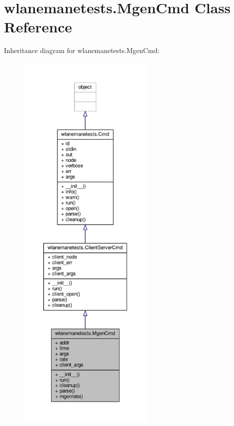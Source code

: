 \hypertarget{classwlanemanetests_1_1_mgen_cmd}{\section{wlanemanetests.\+Mgen\+Cmd Class Reference}
\label{classwlanemanetests_1_1_mgen_cmd}
}


Inheritance diagram for wlanemanetests.\+Mgen\+Cmd\+:
\nopagebreak
\begin{figure}[H]
\begin{center}
\leavevmode
\includegraphics[height=550pt]{classwlanemanetests_1_1_mgen_cmd__inherit__graph}
\end{center}
\end{figure}


